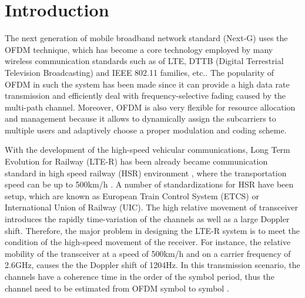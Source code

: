 \documentclass[AMA]{WileyNJD-v1}
\begin{document}
\maketitle
	
	
	
\section{Introduction}\label{section-1}

The next generation of mobile broadband network standard (Next-G) uses the OFDM technique, which has become a core technology employed by many wireless communication standards such as of LTE, DTTB (Digital Terrestrial Television Broadcasting) and IEEE 802.11 families, etc.. The popularity of OFDM in such the system has been made since it can provide a high data rate transmission and efficiently deal with frequency-selective fading caused by the multi-path channel. Moreover, OFDM is also very flexible for resource allocation and management because it allows to dynamically assign the subcarriers to multiple users and adaptively choose a proper modulation and coding scheme. 
	
With the development of the high-speed vehicular communications, Long Term Evolution for Railway (LTE-R) has been already became communication standard in high speed railway (HSR) environment \cite{Luo2012,Fokum2010}, where the transportation speed can be up to 500km/h \cite{Banerjee2016}. A number of standardizations for HSR have been setup, which are known as European Train Control System (ETCS) or International Union of Railway (UIC). The high relative movement of transceiver introduces the  rapidly time-variation of the channels as well as a large Doppler shift. Therefore, the major problem in designing the LTE-R system is to meet the condition of the high-speed movement of the receiver. For instance, the relative mobility of the transceiver at a speed of 500km/h and on a carrier frequency of 2.6GHz, causes the the Doppler shift of 1204Hz. In this transmission scenario, the channels have a coherence time in the order of the symbol period,  thus the channel need to be estimated from OFDM symbol to symbol \cite{Barhumi2005}.
\end{document}

